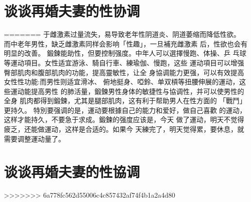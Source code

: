 \documentclass[12pt,UTF8]{ctexbook}
\begin{document}
\section{谈谈再婚夫妻的性协调}
=======
于雌激素过量流失，易导致老年性阴道炎、阴道萎缩而降低性欲。
而中老年男性，缺乏雌激素同样会影响「性趣」，一旦補充雌激素
后，性欲也会有明显的改善。
鍛鍊能助性，但要控制强度。中年人可以選擇慢跑、体操、乒
乓球等運动項目。女性适宜游泳、騎自行車、練瑜伽、慢跑，这些
運动項目可以增强臀部肌肉和腹部肌肉的功能，提高靈敏性，让全
身協调能力更强，可以有效提高女性性功能:而男性则适宜滑冰、
俯地挺身、啞鈴、单双槓等扭腰伸展的運动，这些運动能提高男性
的肺活量，鍛鍊男性身体的敏捷性与協调性，并可以使男性的全身
肌肉都得到鍛鍊，尤其是腿部肌肉，这有利于帮助男人在性方面的
「戰鬥」更持久。
特別要强调的是，運动要根據自己的能力和爱好，做自己喜歡
的運动，这样才能持久，不要急于求成。鍛鍊的强度应该是，今天
做了運动，明天不觉得疲乏，还能做運动，这样是合适的。如果今
天練完了，明天觉得累，要休息，就需要调整運动量了。

\section{谈谈再婚夫妻的性協调}
>>>>>>> 6a778fc562d55006c4c857432af74f4b1a2a4d80
\end{document}
